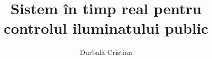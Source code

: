 \documentclass[a4paper,11pt]{scrreprt}                       %
\def \chapters {./chapters}      														 %
\begin{document}

\title{Sistem în timp real pentru controlul iluminatului public}					    %
\author{Durbală Cristian}																				%

\maketitle


\tableofcontents 
\printnoidxglossaries																				%
\listoffigures 
{}

\clearpage








\appendix
\appendixpage
\addappheadtotoc
\begin{appendices}																				  %

\end{appendices}

\cleardoublepage

\printbibliography[heading=bibintoc]
\end{document}
